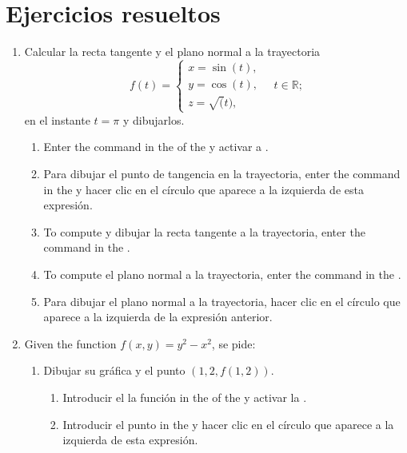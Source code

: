 \section{Ejercicios resueltos}
\begin{enumerate}[leftmargin=*]
\item Calcular la recta tangente y el plano normal a la trayectoria
      \[
      f(t)=
      \begin{cases}
      x=\sin(t), \\
      y=\cos(t), \\
      z=\sqrt(t),
      \end{cases}
      \quad t\in \mathbb{R};
      \]
      en el instante $t=\pi$ y dibujarlos.

      \begin{indication}
      \begin{enumerate}
      \item Enter the command  in the  of the  y activar a .
      \item Para dibujar el punto de tangencia en la trayectoria, enter the command  in the  y hacer clic en el círculo que aparece a la izquierda de esta expresión.
      \item To compute y dibujar la recta tangente a la trayectoria, enter the command  in the .
      \item To compute el plano normal a la trayectoria, enter the command  in the .
      \item Para dibujar el plano normal a la trayectoria, hacer clic en el círculo que aparece a la izquierda de la expresión anterior.
      \end{enumerate}
      \end{indication}

\item Given the function $f(x,y)=y^2-x^2$, se pide:
      \begin{enumerate}
      \item Dibujar su gráfica y el punto $(1,2,f(1,2))$.
            \begin{indication}
            \begin{enumerate}
            \item Introducir el la función  in the  of the  y activar la .
            \item Introducir el punto  in the  y hacer clic en el círculo que aparece a la izquierda de esta expresión.
            \end{enumerate}


\end{indication}
\end{enumerate}
\end{enumerate}
